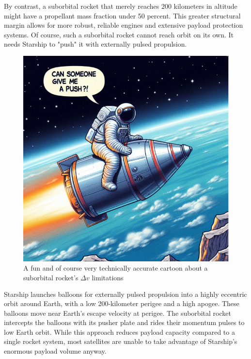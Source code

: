 \documentclass{article}
\begin{document}
{By contrast, a suborbital rocket that merely reaches 200 kilometers in altitude might have a propellant mass fraction under 50 percent. This greater structural margin allows for more robust, reliable engines and extensive payload protection systems. Of course, such a suborbital rocket cannot reach orbit on its own.  It needs Starship to "push" it with externally pulsed propulsion.
\begin{figure}[htpb]
    \centering
    \includegraphics[width=0.5\linewidth]{images/suborbital_push_cartoon.png}
    \caption{A fun and of course very technically accurate cartoon about a suborbital rocket's $\Delta v$ limitations}
    \label{fig:suborbital-cartoon}
\end{figure}



Starship launches balloons for externally pulsed propulsion into a highly eccentric orbit around Earth, with a low 200-kilometer perigee and a high apogee. These balloons move near Earth’s escape velocity at perigee. The suborbital rocket intercepts the balloons with its pusher plate and rides their momentum pulses to low Earth orbit. While this approach reduces payload capacity compared to a single rocket system, most satellites are unable to take advantage of Starship’s enormous payload volume anyway.

}
\end{document}
